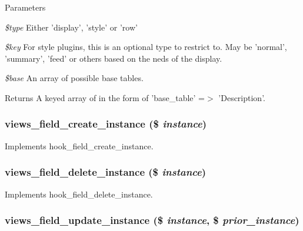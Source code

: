 \begin{DoxyParams}{Parameters}
\item[{\em \$type}]Either 'display', 'style' or 'row' \item[{\em \$key}]For style plugins, this is an optional type to restrict to. May be 'normal', 'summary', 'feed' or others based on the neds of the display. \item[{\em \$base}]An array of possible base tables.\end{DoxyParams}
\begin{DoxyReturn}{Returns}
A keyed array of in the form of 'base\_\-table' =$>$ 'Description'. 
\end{DoxyReturn}
\hypertarget{views_8module_a190407236048bea187c49db49f19e9ce}{
\subsubsection[{views\_\-field\_\-create\_\-instance}]{\setlength{\rightskip}{0pt plus 5cm}views\_\-field\_\-create\_\-instance (\$ {\em instance})}}
\label{views_8module_a190407236048bea187c49db49f19e9ce}
Implements hook\_\-field\_\-create\_\-instance. \hypertarget{views_8module_a62211abcf036f968e40bcf20158f10c4}{
\subsubsection[{views\_\-field\_\-delete\_\-instance}]{\setlength{\rightskip}{0pt plus 5cm}views\_\-field\_\-delete\_\-instance (\$ {\em instance})}}
\label{views_8module_a62211abcf036f968e40bcf20158f10c4}
Implements hook\_\-field\_\-delete\_\-instance. \hypertarget{views_8module_aad19a47ddacc5b8344e42a6ff92b7c4f}{
\subsubsection[{views\_\-field\_\-update\_\-instance}]{\setlength{\rightskip}{0pt plus 5cm}views\_\-field\_\-update\_\-instance (\$ {\em instance}, \/  \$ {\em prior\_\-instance})}}
